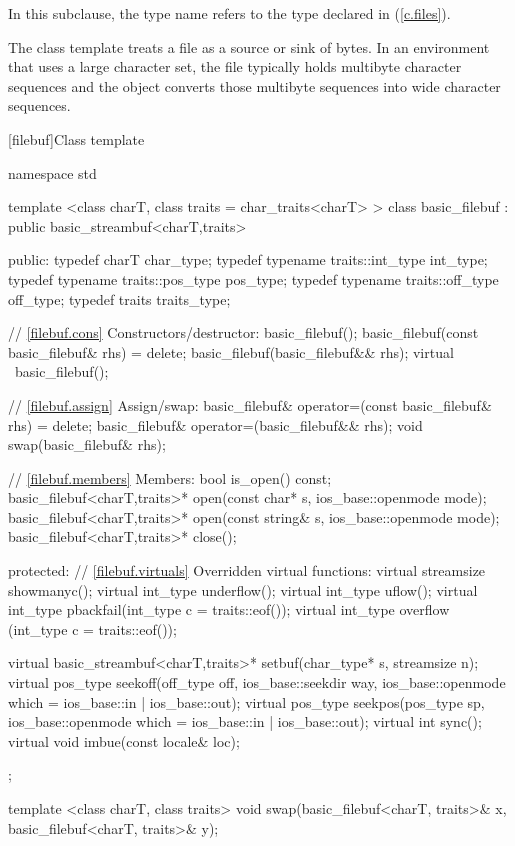 \pnum
In this subclause, the type name  refers to
the type
declared in
%
(\ref{c.files}).

\pnum
\enternote The class template  treats a file as a source or
sink of bytes. In an environment that uses a large character set, the file
typically holds multibyte character sequences and the 
object converts those multibyte sequences into wide character sequences.
\exitnote

[filebuf]{Class template }

%
\begin{codeblock}
namespace std {
  template <class charT, class traits = char_traits<charT> >
  class basic_filebuf : public basic_streambuf<charT,traits> {
  public:
    typedef charT                     char_type;
    typedef typename traits::int_type int_type;
    typedef typename traits::pos_type pos_type;
    typedef typename traits::off_type off_type;
    typedef traits                    traits_type;

    // \ref{filebuf.cons} Constructors/destructor:
    basic_filebuf();
    basic_filebuf(const basic_filebuf& rhs) = delete;
    basic_filebuf(basic_filebuf&& rhs);
    virtual ~basic_filebuf();

    // \ref{filebuf.assign} Assign/swap:
    basic_filebuf& operator=(const basic_filebuf& rhs) = delete;
    basic_filebuf& operator=(basic_filebuf&& rhs);
    void swap(basic_filebuf& rhs);

     // \ref{filebuf.members} Members:
    bool is_open() const;
    basic_filebuf<charT,traits>* open(const char* s,
        ios_base::openmode mode);
    basic_filebuf<charT,traits>* open(const string& s,
        ios_base::openmode mode);
    basic_filebuf<charT,traits>* close();

  protected:
    // \ref{filebuf.virtuals} Overridden virtual functions:
    virtual streamsize showmanyc();
    virtual int_type underflow();
    virtual int_type uflow();
    virtual int_type pbackfail(int_type c = traits::eof());
    virtual int_type overflow (int_type c = traits::eof());

    virtual basic_streambuf<charT,traits>*
        setbuf(char_type* s, streamsize n);
    virtual pos_type seekoff(off_type off, ios_base::seekdir way,
        ios_base::openmode which = ios_base::in | ios_base::out);
    virtual pos_type seekpos(pos_type sp,
        ios_base::openmode which = ios_base::in | ios_base::out);
    virtual int      sync();
    virtual void     imbue(const locale& loc);
  };

  template <class charT, class traits>
  void swap(basic_filebuf<charT, traits>& x,
            basic_filebuf<charT, traits>& y);
}
\end{codeblock}

